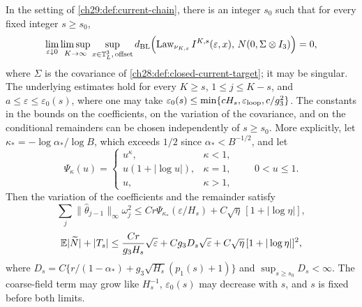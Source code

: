 \begin{theorem}\label{ch29:thm:every-fixed-side-gaussian}
In the setting of \cref{ch29:def:current-chain}, there is an integer $s_0$ such that for every fixed integer $s\ge s_0$,
\[
 \lim_{\varepsilon\downarrow0}\limsup_{K\to\infty}\sup_{x\in\mathbb T_L^3,\,\text{offset}}d_{\mathrm{BL}}\Bigl(\operatorname{Law}_{\nu_{K,s}}I^{K,s}(\varepsilon,x),\,N(0,\Sigma\otimes I_3)\Bigr)=0,
\]
where $\Sigma$ is the covariance of \cref{ch28:def:closed-current-target}; it may be singular. The underlying estimates hold for every $K\ge s$, $1\le j\le K-s$, and $a\le\varepsilon\le\varepsilon_0(s)$, where one may take $\varepsilon_0(s)\le\min\{cH_s,\varepsilon_{\rm loop},c/g_3^2\}$. The constants in the bounds on the coefficients, on the variation of the covariance, and on the conditional remainders can be chosen independently of $s\ge s_0$. More explicitly, let $\kappa_*=-\log\alpha_*/\log B$, which exceeds $1/2$ since $\alpha_*<B^{-1/2}$, and let
\[
 \Psi_\kappa(u)=\begin{cases}u^\kappa,&\kappa<1,\\ u(1+|\log u|),&\kappa=1,\\ u,&\kappa>1,\end{cases}\qquad0<u\le1.
\]
Then the variation of the coefficients and the remainder satisfy
\[
 \sum_j\|\widehat\theta_{j-1}\|_\infty\omega_j^2\le Cr\Psi_{\kappa_*}(\varepsilon/H_s)+C\sqrt\eta\,[1+|\log\eta|],
\]
\[
 \mathbb E|\widetilde N|+|T_s|\le\frac{Cr}{g_3H_s}\sqrt\varepsilon+Cg_3D_s\sqrt\varepsilon+C\sqrt\eta\,[1+|\log\eta|]^2,
\]
where $D_s=C\{r/(1-\alpha_*)+g_3\sqrt{H_s}(p_1(s)+1)\}$ and $\sup_{s\ge s_0}D_s<\infty$. The coarse-field term may grow like $H_s^{-1}$, $\varepsilon_0(s)$ may decrease with $s$, and $s$ is fixed before both limits.
\end{theorem}

